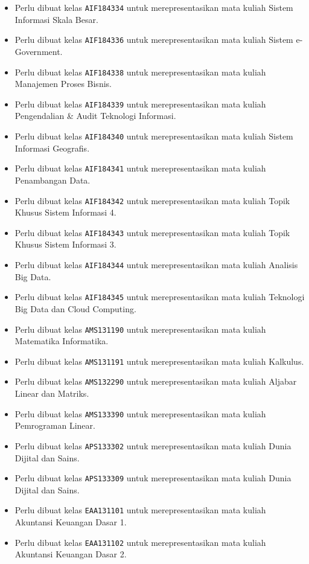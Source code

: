 \begin{enumerate}
\begin{itemize}
		\item Perlu dibuat kelas \texttt{AIF184334} untuk merepresentasikan mata kuliah Sistem Informasi Skala Besar.
		\item Perlu dibuat kelas \texttt{AIF184336} untuk merepresentasikan mata kuliah Sistem e-Government.
		\item Perlu dibuat kelas \texttt{AIF184338} untuk merepresentasikan mata kuliah Manajemen Proses Bisnis.
		\item Perlu dibuat kelas \texttt{AIF184339} untuk merepresentasikan mata kuliah Pengendalian \& Audit Teknologi Informasi.
		\item Perlu dibuat kelas \texttt{AIF184340} untuk merepresentasikan mata kuliah Sistem Informasi Geografis.
		\item Perlu dibuat kelas \texttt{AIF184341} untuk merepresentasikan mata kuliah Penambangan Data.
		\item Perlu dibuat kelas \texttt{AIF184342} untuk merepresentasikan mata kuliah Topik Khusus Sistem Informasi 4.
		\item Perlu dibuat kelas \texttt{AIF184343} untuk merepresentasikan mata kuliah Topik Khusus Sistem Informasi 3.
		\item Perlu dibuat kelas \texttt{AIF184344} untuk merepresentasikan mata kuliah Analisis Big Data.
		\item Perlu dibuat kelas \texttt{AIF184345} untuk merepresentasikan mata kuliah Teknologi Big Data dan Cloud Computing.
		\item Perlu dibuat kelas \texttt{AMS131190} untuk merepresentasikan mata kuliah Matematika Informatika.
		\item Perlu dibuat kelas \texttt{AMS131191} untuk merepresentasikan mata kuliah Kalkulus.
		\item Perlu dibuat kelas \texttt{AMS132290} untuk merepresentasikan mata kuliah Aljabar Linear dan Matriks.
		\item Perlu dibuat kelas \texttt{AMS133390} untuk merepresentasikan mata kuliah Pemrograman Linear.
		\item Perlu dibuat kelas \texttt{APS133302} untuk merepresentasikan mata kuliah Dunia Dijital dan Sains.
		\item Perlu dibuat kelas \texttt{APS133309} untuk merepresentasikan mata kuliah Dunia Dijital dan Sains.
		\item Perlu dibuat kelas \texttt{EAA131101} untuk merepresentasikan mata kuliah Akuntansi Keuangan Dasar 1.
		\item Perlu dibuat kelas \texttt{EAA131102} untuk merepresentasikan mata kuliah Akuntansi Keuangan Dasar 2.

\end{itemize}
\end{enumerate}
